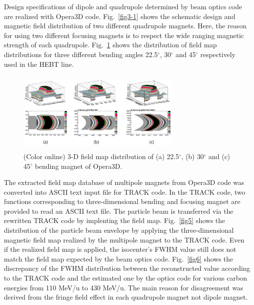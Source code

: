 \documentclass[jkps,preprint,fleqn,showpacs,showkeys]{revtex4}
\begin{document}
Design specifications of dipole and quadrupole determined by beam optics code are realized with Opera3D code.
Fig.~\ref{fig3-1} shows the schematic design and magnetic field distribution of two different quadrupole magnets.
Here, the reason for using two different
focusing magnets is to respect the wide ranging magnetic strength of each quadrupole.
Fig.~\ref{fig4} shows the distribution of field map distributions
for three different bending angles 22.5$^{\circ}$, 30$^{\circ}$ and 45$^{\circ}$ respectively used in the HEBT line.
\begin{figure}
  \begin{center}
    \includegraphics[width=8.0cm, height=4cm]{Fig05.png}
    \caption{(Color online) 3-D field map distribution of (a) 22.5$^{\circ}$, (b) 30$^{\circ}$ and (c) 45$^{\circ}$ bending magnet of Opera3D.}
    \label{fig4}
  \end{center}
\end{figure}
The extracted field map database of multipole magnets from Opera3D code was converted into ASCII text input file for TRACK code.
In the TRACK code, two functions corresponding to three-dimensional bending and focusing magnet are provided to read an ASCII text file.
The particle beam is transferred via the rewritten TRACK code by implenting the field map.
Fig.~\ref{fig5} shows the distribution of the particle beam envelope by applying the three-dimensional magnetic field map
realized by the multipole magnet to the TRACK code.
Even if the realized field map is applied, the isocenter's FWHM value still does not match the field map expected by the beam optics code.
Fig.~\ref{fig6} shows the discrepancy of the FWHM distribution between the reconstructed value according to the TRACK code
and the estimated one by the optics code for various carbon energies from 110 MeV/u to 430 MeV/u.   
The main reason for disagreement was derived from the fringe field effect in each quadrupole magnet not dipole magnet.
\end{document}
